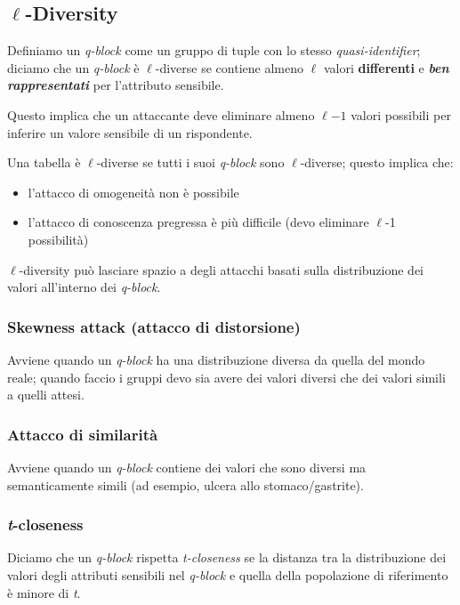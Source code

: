 \documentclass{report}
\begin{document}
\subsection{\texorpdfstring{$\ell$}{l}-Diversity}
Definiamo un \textit{q-block} come un gruppo di tuple con lo stesso \textit{quasi-identifier};
diciamo che un \textit{q-block} è \texorpdfstring{$\ell$}{l}-diverse se contiene almeno
\texorpdfstring{$\ell$}{l} valori \textbf{differenti} e \textit{\textbf{ben rappresentati}} per l'attributo sensibile.

Questo implica che un attaccante deve eliminare almeno \texorpdfstring{$\ell$}{l}$-1$ valori 
possibili per inferire un valore sensibile di un rispondente.

Una tabella è \texorpdfstring{$\ell$}{l}-diverse se tutti i suoi \textit{q-block} sono
\texorpdfstring{$\ell$}{l}-diverse; questo implica che:
\begin{itemize}
    \item l'attacco di omogeneità non è possibile
    \item l'attacco di conoscenza pregressa è più difficile (devo eliminare \texorpdfstring{$\ell$}{l}-1 possibilità)
\end{itemize}

\texorpdfstring{$\ell$}{l}-diversity può lasciare spazio a degli attacchi basati sulla distribuzione 
dei valori all'interno dei \textit{q-block}.

\subsubsection{Skewness attack (attacco di distorsione)}
Avviene quando un  \textit{q-block} ha una distribuzione diversa da quella del mondo reale;
quando faccio i gruppi devo sia avere dei valori diversi che dei valori simili a quelli attesi.

\subsubsection{Attacco di similarità}
Avviene quando un \textit{q-block} contiene dei valori che sono diversi ma semanticamente 
simili (ad esempio, ulcera allo stomaco/gastrite).

\subsubsection{\textit{t}-closeness}
Diciamo che un \textit{q-block} rispetta \textit{t-closeness} se la distanza 
tra la distribuzione dei valori degli attributi sensibili nel \textit{q-block} 
e quella della popolazione di riferimento è minore di \textit{t}.
\end{document}
